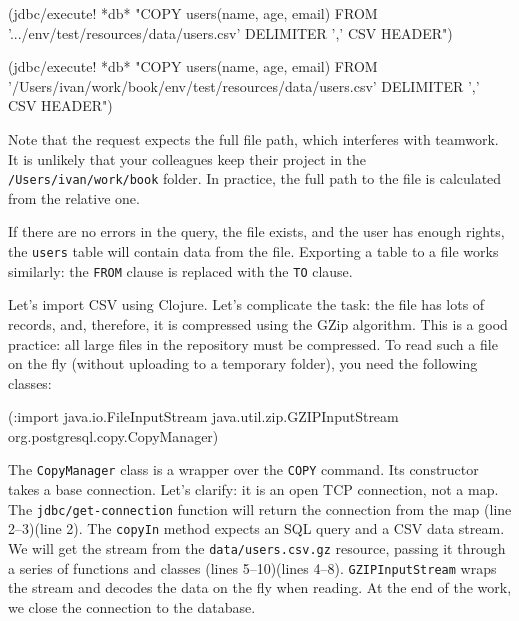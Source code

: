 \ifx\DEVICETYPE\MOBILE

\begin{english}
  \begin{clojure}
(jdbc/execute! *db*
 "COPY users(name, age, email)
  FROM
  '.../env/test/resources/data/users.csv'
  DELIMITER ',' CSV HEADER")
  \end{clojure}
\end{english}

\else

\begin{english}
  \begin{clojure}
(jdbc/execute! *db*
 "COPY users(name, age, email)
  FROM '/Users/ivan/work/book/env/test/resources/data/users.csv'
  DELIMITER ',' CSV HEADER")
  \end{clojure}
\end{english}

\fi

Note that the request expects the full file path, which interferes with teamwork. It is unlikely that your colleagues keep their project in the \verb|/Users/ivan/work/book| folder. In practice, the full path to the file is calculated from the relative one.

If there are no errors in the query, the file exists, and the user has enough rights, the \verb|users| table will contain data from the file. Exporting a table to a file works similarly: the \verb|FROM| clause is replaced with the \verb|TO| clause.


Let's import CSV using Clojure. Let's complicate the task: the file has lots of records, and, therefore, it is compressed using the GZip algorithm.
This is a good practice: all large files in the repository must be compressed. To read such a file on the fly (without uploading to a temporary folder), you need the following classes:

\begin{english}
  \begin{clojure}
(:import java.io.FileInputStream
         java.util.zip.GZIPInputStream
         org.postgresql.copy.CopyManager)
  \end{clojure}
\end{english}

The \verb|CopyManager| class is a wrapper over the \verb|COPY| command. Its constructor takes a base connection. Let's clarify: it is an open TCP connection, not a map. The \verb|jdbc/get-connection| function will return the connection from the map \ifx\DEVICETYPE\MOBILE (line 2--3)\else(line 2)\fi. The \verb|copyIn| method expects an SQL query and a CSV data stream. We will get the stream from the \verb|data/users.csv.gz| resource, passing it through a series of functions and classes \ifx\DEVICETYPE\MOBILE (lines 5--10)\else (lines 4--8)\fi. \verb|GZIPInputStream| wraps the stream and decodes the data on the fly when reading. At the end of the work, we close the connection to the database.

